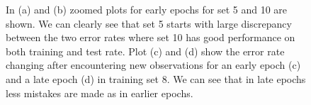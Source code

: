 \documentclass[12pt]{article}
\begin{document}
\begin{figure}[h!]
	\centering
	\hfill
	\hfill
	\hfill
	\caption[]{In (a) and (b) zoomed plots for early epochs for set 5 and 10 are shown. We can clearly see that set 5 starts with large discrepancy between the two error rates where set 10 has good performance on both training and test rate. Plot (c) and (d) show the error rate changing after encountering new observations for an early epoch (c) and a late epoch (d) in training set 8. We can see that in late epochs less mistakes are made as in earlier epochs. }
	\label{fig:2.close}
\end{figure}
\end{document}
